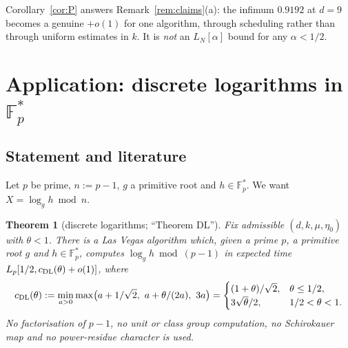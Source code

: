\documentclass[11pt]{amsart}
\newtheorem{theorem}{Theorem}[section]
\theoremstyle{definition}
\newcommand{\F}{\mathbb{F}}
\begin{document}
\noindent Corollary~\ref{cor:P} answers Remark~\ref{rem:claims}(a): the infimum $0.9192$ at $d=9$ becomes a genuine $+o(1)$ for one
algorithm, through scheduling rather than through uniform estimates in $k$. It is \emph{not} an $L_N[\alpha]$ bound for any $\alpha<1/2$.

\section{Application: discrete logarithms in \texorpdfstring{$\F_p^*$}{F\_p*}}\label{sec:dlog}

\begin{center}
\end{center}

\subsection{Statement and literature}
Let $p$ be prime, $n:=p-1$, $g$ a primitive root and $h\in\F_p^*$. We want $X=\log_gh\bmod n$.

\begin{theorem}[discrete logarithms; ``Theorem DL'']\label{thm:DL}
Fix admissible $(d,k,\mu,\eta_0)$ with $\theta<1$. There is a Las Vegas algorithm which, given a prime $p$, a primitive root $g$ and
$h\in\F_p^*$, computes $\log_gh\bmod(p-1)$ in expected time $L_p[1/2,c_{\rm DL}(\theta)+o(1)]$, where
\[
c_{\rm DL}(\theta):=\min_{a>0}\max\bigl(a+1/\sqrt2,\ a+\theta/(2a),\ 3a\bigr)=\begin{cases}(1+\theta)/\sqrt2,&\theta\le1/2,\\ 3\sqrt\theta/2,&1/2<\theta<1.\end{cases}
\]
No factorisation of $p-1$, no unit or class group computation, no Schirokauer map and no power-residue character is used.
\end{theorem}
\end{document}

